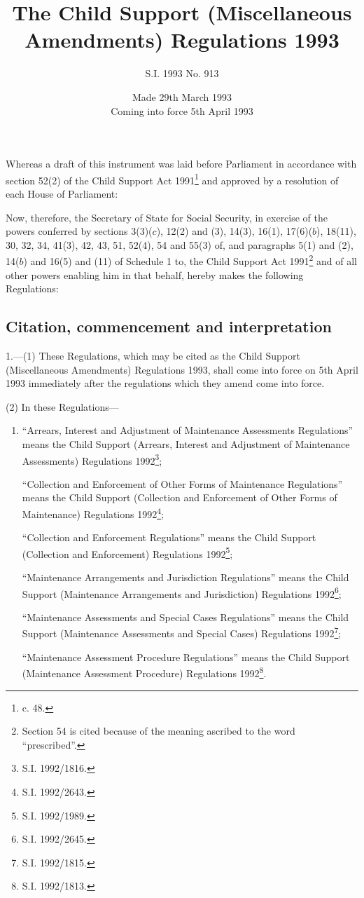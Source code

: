 \documentclass[a4paper]{article}
\title{The Child Support (Miscellaneous Amendments) Regulations 1993}
\author{S.I. 1993 No. 913}
\date{Made 29th March 1993\\Coming into force 5th April 1993}
\begin{document}
\maketitle

\noindent
Whereas a draft of this instrument was laid before Parliament in accordance with section 52(2) of the Child Support Act 1991\footnote{ c. 48.} and approved by a resolution of each House of Parliament: 

Now, therefore, the Secretary of State for Social Security, in exercise of the powers conferred by sections 3(3)($c$), 12(2) and (3), 14(3), 16(1), 17(6)($b$), 18(11), 30, 32, 34, 41(3), 42, 43, 51, 52(4), 54 and 55(3) of, and paragraphs 5(1) and (2), 14($b$) and 16(5) and (11) of Schedule 1 to, the Child Support Act 1991\footnote{\frenchspacing Section 54 is cited because of the meaning ascribed to the word “prescribed”.} and of all other powers enabling him in that behalf, hereby makes the following Regulations:


{\sloppy

\tableofcontents

}

\setcounter{secnumdepth}{-2}

\subsection[1. Citation, commencement and interpretation]{Citation, commencement and interpretation}

1.—(1) These Regulations, which may be cited as the Child Support (Miscellaneous Amendments) Regulations 1993, shall come into force on 5th April 1993 immediately after the regulations which they amend come into force.

(2) In these Regulations---
\begin{enumerate}\item[]
“Arrears, Interest and Adjustment of Maintenance Assessments Regulations” means the Child Support (Arrears, Interest and Adjustment of Maintenance Assessments) Regulations 1992\footnote{\frenchspacing S.I. 1992/1816.};

“Collection and Enforcement of Other Forms of Maintenance Regulations” means the Child Support (Collection and Enforcement of Other Forms of Maintenance) Regulations 1992\footnote{\frenchspacing S.I. 1992/2643.};

“Collection and Enforcement Regulations” means the Child Support (Collection and Enforcement) Regulations 1992\footnote{\frenchspacing S.I. 1992/1989.};

“Maintenance Arrangements and Jurisdiction Regulations” means the Child Support (Maintenance Arrangements and Jurisdiction) Regulations 1992\footnote{\frenchspacing S.I. 1992/2645.};

“Maintenance Assessments and Special Cases Regulations” means the Child Support (Maintenance Assessments and Special Cases) Regulations 1992\footnote{\frenchspacing S.I. 1992/1815.};

“Maintenance Assessment Procedure Regulations” means the Child Support (Maintenance Assessment Procedure) Regulations 1992\footnote{\frenchspacing S.I. 1992/1813.}.
\end{enumerate}
\end{document}
